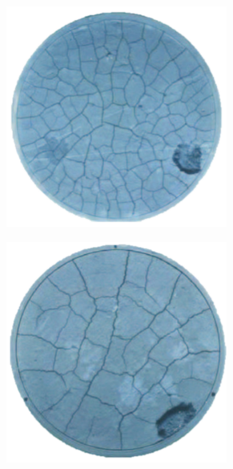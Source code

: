 \begin{frame}
\begin{columns}[T]
\begin{column}{0.6\textwidth}
\begin{figure}
        \begin{subfigure}{0.32\textwidth}
          \centering
          \includegraphics[width=0.8\textwidth]{Chapter345/figures/4mm_exp.png}
        \end{subfigure}
        \begin{subfigure}{0.32\textwidth}
          \centering
          \includegraphics[width=0.8\textwidth]{Chapter345/figures/8mm_exp.png}
        \end{subfigure}
        \begin{subfigure}{0.32\textwidth}
          \centering

\end{subfigure}
\end{figure}
\end{column}
\end{columns}
\end{frame}

